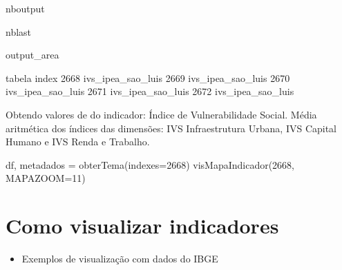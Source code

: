 \documentclass[letterpaper,10pt,brazil]{sphinxmanual}
\let\sphinxpxdimen\pdfpxdimen\else\newdimen\sphinxpxdimen
\begin{document}
\begin{sphinxuseclass}{nboutput}
\begin{sphinxuseclass}{nblast}
{\begin{sphinxuseclass}{output_area}
\begin{sphinxuseclass}{}
\begin{sphinxVerbatim}[commandchars=\\\{\}]
                  tabela
index
2668   ivs\_ipea\_sao\_luis
2669   ivs\_ipea\_sao\_luis
2670   ivs\_ipea\_sao\_luis
2671   ivs\_ipea\_sao\_luis
2672   ivs\_ipea\_sao\_luis
\end{sphinxVerbatim}



\end{sphinxuseclass}
\end{sphinxuseclass}
}

\end{sphinxuseclass}
\end{sphinxuseclass}
\sphinxAtStartPar
Obtendo valores de do indicador: Índice de Vulnerabilidade Social. Média aritmética dos índices das dimensões: IVS Infraestrutura Urbana, IVS Capital Humano e IVS Renda e Trabalho.

\begin{sphinxVerbatim}[commandchars=\\\{\}]
\PYGZsh{}df, metadados = obterTema(indexes=\PYGZsq{}2668\PYGZsq{})
visMapaIndicador(\PYGZsq{}2668\PYGZsq{}, MAPA\PYGZus{}ZOOM=11)
\end{sphinxVerbatim}

\noindent\sphinxincludegraphics[width=1012\sphinxpxdimen,height=609\sphinxpxdimen]{{saida}.png}

\sphinxstepscope


\section{Como visualizar indicadores}
\label{\detokenize{exemplos/visualizando:Como-visualizar-indicadores}}\label{\detokenize{exemplos/visualizando::doc}}\begin{itemize}
\item {} 
\sphinxAtStartPar
Exemplos de visualização com dados do IBGE

\end{itemize}
\end{document}
